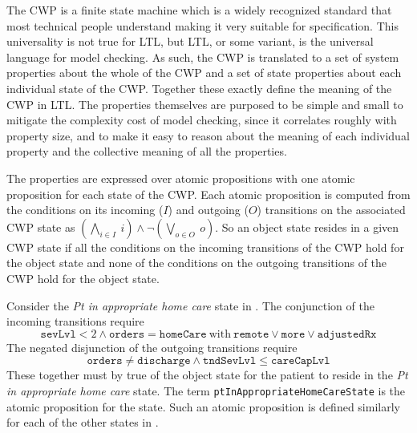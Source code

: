 The CWP is a finite state machine which is a widely recognized standard that most technical people understand making it very suitable for specification. This universality is not true for LTL, but LTL, or some variant, is the universal language for model checking. As such, the CWP is translated to a set of system properties about the whole of the CWP and a set of state properties about each individual state of the CWP. Together these exactly define the meaning of the CWP in LTL. The properties themselves are purposed to be simple and small to mitigate the complexity cost of model checking, since it correlates roughly with property size, and to make it easy to reason about the meaning of each individual property and the collective meaning of all the properties. 

The properties are expressed over atomic propositions with one atomic proposition for each state of the CWP. Each atomic proposition is computed from the conditions on its incoming ($I$) and outgoing ($O$) transitions on the associated CWP state as $(\bigwedge_{i \in I}\ i) \wedge \neg(\bigvee_{o \in O}\ o)$. So an object state resides in a given CWP state if all the conditions on the incoming transitions of the CWP hold for the object state and none of the conditions on the outgoing transitions of the CWP hold for the object state.

Consider the \emph{Pt in appropriate home care} state in . The conjunction of the incoming transitions require
%
\[
  \mathtt{sevLvl} < 2 \wedge \mathtt{orders} = \mathtt{homeCare}\ \mathrm{with}\ \mathtt{remote} \vee \mathtt{more} \vee \mathtt{adjustedRx}
\]
%
The negated disjunction of the outgoing transitions require
%
\[
  \mathtt{orders} \neq \mathtt{discharge} \wedge \mathtt{tndSevLvl} \le \mathtt{careCapLvl}
\]
%
\noindent These together must by true of the object state for the patient to reside in the \emph{Pt in appropriate home care} state. The term \texttt{ptInAppropriateHomeCareState} is the atomic proposition for the state. Such an atomic proposition is defined similarly for each of the other states in .

